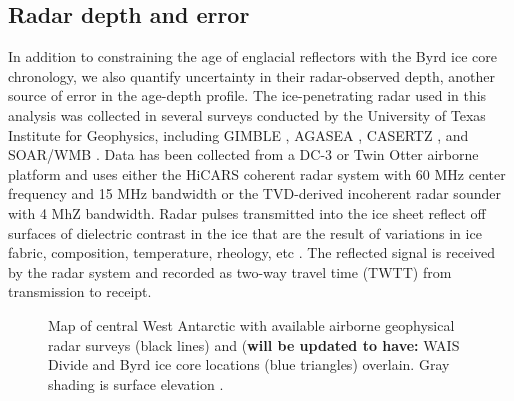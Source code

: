 \subsection{Radar depth and error}
In addition to constraining the age of englacial reflectors with the Byrd ice core chronology, we also quantify uncertainty in their radar-observed depth, another source of error in the age-depth profile. The ice-penetrating radar used in this analysis was collected in several surveys conducted by the University of Texas Institute for Geophysics, including GIMBLE \citep{wais2016}, AGASEA \citep{holt2006}, CASERTZ \citep{morse2002}, and SOAR/WMB \citep{luyendyk2003}. Data has been collected from a DC-3 or Twin Otter airborne platform and uses either the HiCARS coherent radar system with 60 MHz center frequency and 15 MHz bandwidth \citep{peters2005} or the TVD-derived incoherent radar sounder \citep{blankenship2001} with 4 MhZ bandwidth. Radar pulses transmitted into the ice sheet reflect off surfaces of dielectric contrast in the ice that are the result of variations in ice fabric, composition, temperature, rheology, etc \citep{fujita2000}. The reflected signal is received by the radar system and recorded as two-way travel time (TWTT) from transmission to receipt. 


\begin{figure}[h]\label{fig:radarmap}
\centering
{}
\caption{Map of central West Antarctic with available airborne geophysical radar surveys (black lines) and (\textbf{will be updated to have:} WAIS Divide and Byrd ice core locations (blue triangles) overlain. Gray shading is surface elevation \citep{fretwell2013}. }

\end{figure}



